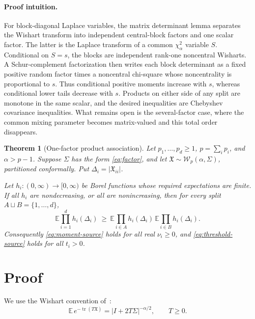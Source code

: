 \documentclass[11pt]{article}
\newtheorem{theorem}{Theorem}
\newcommand{\tr}{\operatorname{tr}}
\newcommand{\E}{\mathbb E}
\begin{document}
\paragraph{Proof intuition.}
For block-diagonal Laplace variables, the matrix determinant lemma separates
the Wishart transform into independent central-block factors and one scalar
factor.  The latter is the Laplace transform of a common
\(\chi^2_\alpha\) variable \(S\).  Conditional on \(S=s\), the blocks are
independent rank-one noncentral Wisharts.  A Schur-complement factorization
then writes each block determinant as a fixed positive random factor times a
noncentral chi-square whose noncentrality is proportional to \(s\).  Thus
conditional positive moments increase with \(s\), whereas conditional lower
tails decrease with \(s\).  Products on either side of any split are monotone
in the same scalar, and the desired inequalities are Chebyshev covariance
inequalities.  What remains open is the several-factor case, where the common
mixing parameter becomes matrix-valued and this total order disappears.

\begin{theorem}[One-factor product association]\label{thm:main}
Let \(p_1,\ldots,p_d\geq1\), \(p=\sum_i p_i\), and
\(\alpha>p-1\).  Suppose \(\Sigma\) has the form \eqref{eq:factor}, and let
\(\mathfrak X\sim\mathcal W_p(\alpha,\Sigma)\), partitioned conformally.
Put \(\Delta_i=|\mathfrak X_{ii}|\).

Let \(h_i:(0,\infty)\to[0,\infty)\) be Borel functions whose required
expectations are finite.  If all \(h_i\) are nondecreasing, or all are
nonincreasing, then for every split \(A\sqcup B=\{1,\ldots,d\}\),
\begin{equation}\label{eq:split}
 \E\prod_{i=1}^d h_i(\Delta_i)
 \ \geq\
 \E\prod_{i\in A}h_i(\Delta_i)\,
 \E\prod_{i\in B}h_i(\Delta_i).
\end{equation}
Consequently \eqref{eq:moment-source} holds for all real \(\nu_i\geq0\),
and \eqref{eq:threshold-source} holds for all \(t_i>0\).
\end{theorem}

\section{Proof}

We use the Wishart convention of~\cite{GOR,Muirhead}:
\begin{equation}\label{eq:central-LT}
 \E\,e^{-\tr(T\mathfrak X)}
 =|I+2T\Sigma|^{-\alpha/2},\qquad T\geq0.
\end{equation}
\end{document}
